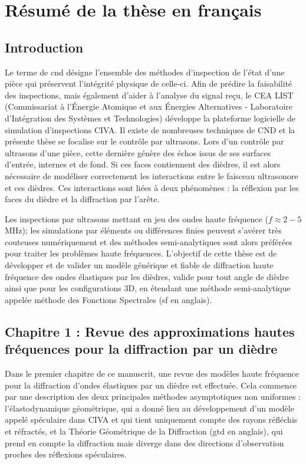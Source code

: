 \chapter[][Résumé de la thèse en français]{Résumé de la thèse en français}

\section[Introduction]{Introduction}

\hspace{2em}Le terme de \acrfull{cnd} désigne l'ensemble des méthodes d'inspection de l'état d'une pièce qui préservent l'intégrité physique de celle-ci. Afin de prédire la faisabilité des inspections, mais également d'aider à l'analyse du signal reçu, le CEA LIST (Commissariat à l'Énergie Atomique et aux Énergies Alternatives - Laboratoire d'Intégration des Systèmes et Technologies) développe la plateforme logicielle de simulation d'inspections CIVA. Il existe de nombreuses techniques de CND et la présente thèse se focalise sur le contrôle par ultrasons. Lors d'un contrôle par ultrasons d'une pièce, cette dernière génère des échos issus de ses surfaces d'entrée, internes et de fond. Si ces faces contiennent des dièdres, il est alors nécessaire de modéliser correctement les interactions entre le faisceau ultrasonore et ces dièdres. Ces interactions sont liées à deux phénomènes : la réflexion par les faces du dièdre et la diffraction par l'arête.

Les inspections par ultrasons mettant en jeu des ondes haute fréquence ($f \approx 2-5$ MHz); les simulations par éléments ou différences finies peuvent s'avérer très couteuses numériquement et des méthodes semi-analytiques sont alors préférées pour traiter les problèmes haute fréquences. L'objectif de cette thèse est de développer et de valider un modèle générique et fiable de diffraction haute fréquence des ondes élastiques par les dièdres, valide pour tout angle de dièdre ainsi que pour les configurations 3D, en étendant une méthode semi-analytique appelée méthode des Fonctions Spectrales (\acrshort{sf} en anglais).


\section[Résumé du chapitre 1]{Chapitre 1 : Revue des approximations hautes fréquences pour la diffraction par un dièdre}

\hspace{2em}Dans le premier chapitre de ce manuscrit, une revue des modèles haute fréquence pour la diffraction d'ondes élastiques par un dièdre est effectuée. Cela commence par une description des deux principales méthodes asymptotiques non uniformes : l'élastodynamique géométrique, qui a donné lieu au développement d'un modèle appelé spéculaire dans CIVA et qui tient uniquement compte des rayons réfléchis et réfractés, et la Théorie Géométrique de la Diffraction (\acrshort{gtd} en anglais), qui prend en compte la diffraction mais diverge dans des directions d'observation proches des réflexions spéculaires.

